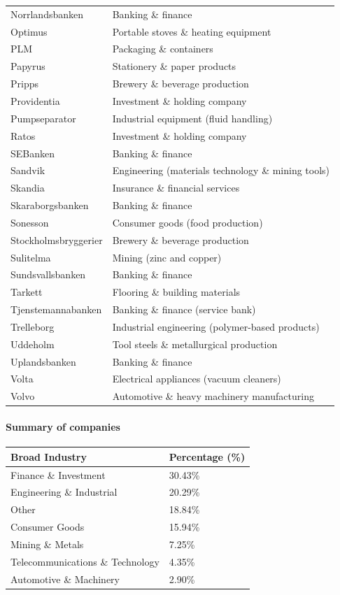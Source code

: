 \documentclass[
]{article}
\begin{document}
\begin{longtable}[]{@{}
  >{\raggedright\arraybackslash}p{}
  >{\raggedright\arraybackslash}p{}@{}}
Norrlandsbanken & Banking \& finance \\
Optimus & Portable stoves \& heating equipment \\
PLM & Packaging \& containers \\
Papyrus & Stationery \& paper products \\
Pripps & Brewery \& beverage production \\
Providentia & Investment \& holding company \\
Pumpseparator & Industrial equipment (fluid handling) \\
Ratos & Investment \& holding company \\
SEBanken & Banking \& finance \\
Sandvik & Engineering (materials technology \& mining tools) \\
Skandia & Insurance \& financial services \\
Skaraborgsbanken & Banking \& finance \\
Sonesson & Consumer goods (food production) \\
Stockholmsbryggerier & Brewery \& beverage production \\
Sulitelma & Mining (zinc and copper) \\
Sundsvallsbanken & Banking \& finance \\
Tarkett & Flooring \& building materials \\
Tjenstemannabanken & Banking \& finance (service bank) \\
Trelleborg & Industrial engineering (polymer-based products) \\
Uddeholm & Tool steels \& metallurgical production \\
Uplandsbanken & Banking \& finance \\
Volta & Electrical appliances (vacuum cleaners) \\
Volvo & Automotive \& heavy machinery manufacturing \\
\end{longtable}

\paragraph{Summary of companies}\label{summary-of-companies}

\begin{longtable}[]{@{}ll@{}}
\toprule\noalign{}
Broad Industry & Percentage (\%) \\
\midrule\noalign{}
\endhead
\bottomrule\noalign{}
\endlastfoot
Finance \& Investment & 30.43\% \\
Engineering \& Industrial & 20.29\% \\
Other & 18.84\% \\
Consumer Goods & 15.94\% \\
Mining \& Metals & 7.25\% \\
Telecommunications \& Technology & 4.35\% \\
Automotive \& Machinery & 2.90\% \\
\end{longtable}
\end{document}
